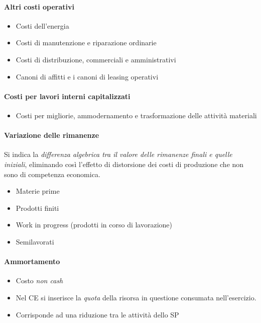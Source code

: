 \paragraph{Altri costi operativi}
\begin{itemize}
    \item Costi dell’energia
    \item Costi di manutenzione e riparazione ordinarie
    \item Costi di distribuzione, commerciali e amministrativi
    \item Canoni di affitti e i canoni di leasing operativi
\end{itemize}

\paragraph{Costi per lavori interni capitalizzati}
\begin{itemize}
    \item Costi per migliorie, ammodernamento
    e trasformazione delle attività materiali
\end{itemize}

\paragraph{Variazione delle rimanenze}
Si indica la \emph{differenza algebrica tra il valore delle rimanenze finali e quelle
iniziali}, eliminando così l’effetto di distorsione dei costi di produzione che non sono di
competenza economica.

\begin{itemize}
    \item Materie prime
    \item Prodotti finiti
    \item Work in progress (prodotti in corso di lavorazione)
    \item Semilavorati
\end{itemize}

\paragraph{Ammortamento}
\begin{itemize}
    \item Costo \emph{non cash}
    \item Nel CE si inserisce la \emph{quota} della risorsa in questione consumata nell'\gls{esercizio}.
    \item Corrisponde ad una riduzione tra le attività dello SP
\end{itemize}

